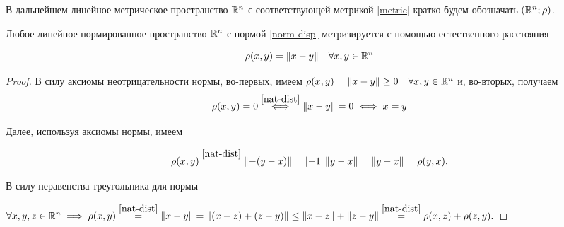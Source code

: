 \documentclass[../../main.tex]{subfiles}
\begin{document}
В дальнейшем линейное метрическое пространство $\mathbb{R}^n$ с 
соответствующей метрикой \eqref{metric} кратко будем обозначать
$\left(\mathbb{R}^n; \rho\right)$.

\begin{thm}
 Любое линейное нормированное пространство $\mathbb{R}^n$ с нормой
 \eqref{norm-disp} метризируется с помощью естественного расстояния

 \begin{equation}
  \label{nat-dist}
  \rho(x, y) = \lVert{x-y}\rVert\quad \forall x, y \in \mathbb{R}^n
 \end{equation}
 
\end{thm}

\begin{proof}
 В силу аксиомы неотрицательности нормы, во-первых, имеем $\rho(x, y) 
 = \lVert{x-y}\rVert \ge 0 \quad \forall x, y \in \mathbb{R}^n$ и, во-вторых, получаем
 \[\rho(x, y) = 0 \stackrel{\eqref{nat-dist}}{\iff} \lVert{x-y}\rVert = 0 
  \iff x = y\]
 
 Далее, используя аксиомы нормы, имеем
 
 \[\rho(x, y) \stackrel{\eqref{nat-dist}}{=} \lVert{-(y-x)}\rVert =
   \left|{-1}\right|\lVert{y-x}\rVert = \lVert{y-x}\rVert = \rho(y, x).\]
 
 В силу неравенства треугольника для нормы
 
 $\forall x, y, z \in \R^n \implies \rho(x, y) \stk{nat-dist}{=} 
  \norm{x-y} = \norm{(x-z) + (z-y)} \le
  \norm{x-z} + \norm{z-y} \stk{nat-dist}{=} \rho(x, z) +  \rho(z, y).$
\end{proof}
\end{document}
